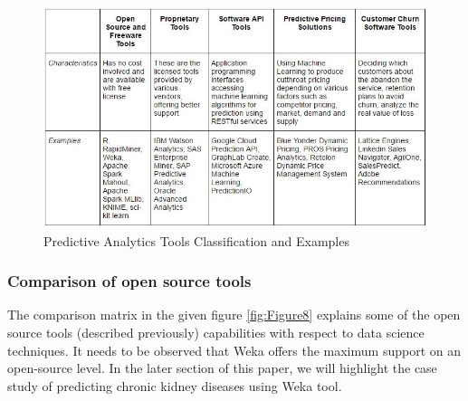 \documentclass[runningheads]{llncs}
\begin{document}
\begin{figure}[htbp]
	\centering
	
	\vspace{-1.5em}
	\hspace*{-0.45cm}
	
	\includegraphics[scale=0.65]{Figure8.jpg}
	\caption{Predictive Analytics Tools Classification and Examples}
	\label{fig:Figure7}
	
\end{figure}
\vspace{-1.5em}
\subsubsection{Comparison of open source tools}
The comparison matrix\cite{15} in the given figure \ref{fig:Figure8} explains some of the open source tools (described previously) capabilities with respect to data science techniques. It needs to be observed that Weka offers the maximum support on an open-source level. In the later section of this paper, we will highlight the case study of predicting chronic kidney diseases using Weka tool.
\end{document}
